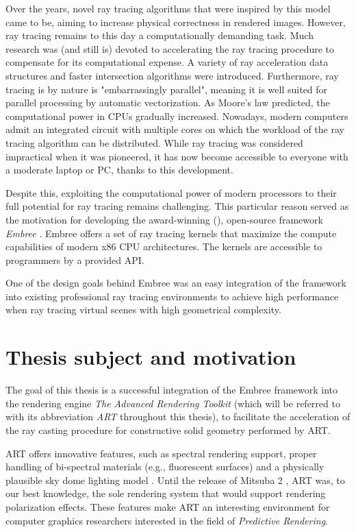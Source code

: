Over the years, novel ray tracing algorithms that were inspired by this model came to be, aiming to increase physical correctness in rendered images. However, ray tracing remains to this day a computationally demanding task. Much research was (and still is) devoted to accelerating the ray tracing procedure to compensate for its computational expense. A variety of ray acceleration data structures and faster intersection algorithms were introduced. Furthermore, ray tracing is by nature is "embarrassingly parallel", meaning it is well suited for parallel processing by automatic vectorization. As Moore’s law predicted, the computational power in CPUs gradually increased. Nowadays, modern computers admit an integrated circuit with multiple cores on which the workload of the ray tracing algorithm can be distributed. While ray tracing was considered impractical when it was pioneered, it has now become accessible to everyone with a moderate laptop or PC, thanks to this development.

Despite this, exploiting the computational power of modern processors to their full potential for ray tracing remains challenging. This particular reason served as the motivation for developing the award-winning (\cite{embreeAward}), open-source framework \emph{Embree} \cite{wald2014embree}. Embree offers a set of ray tracing kernels that maximize the compute capabilities of modern x86 CPU architectures. The kernels are accessible to programmers by a provided API. 

One of the design goals behind Embree was an easy integration of the framework into existing professional ray tracing environments to achieve high performance when ray tracing virtual scenes with high geometrical complexity.


\section*{Thesis subject and motivation}
The goal of this thesis is a successful integration of the Embree framework into the rendering engine \emph{The Advanced Rendering Toolkit} \cite{artSoftware} (which will be referred to with its abbreviation \emph{ART} throughout this thesis), to facilitate the acceleration of the ray casting procedure for constructive solid geometry performed by ART.

ART offers innovative features, such as spectral rendering support, proper handling of bi-spectral materials (e.g., fluorescent surfaces) \cite{mojzik2018handling} and a physically plausible sky dome lighting model \cite{wilkie2013predicting}. Until the release of Mitsuba 2 \cite{nimier2019mitsuba}, ART was, to our best knowledge, the sole rendering system that would support rendering polarization effects. These features make ART an interesting environment for computer graphics researchers interested in the field of \emph{Predictive Rendering}.

